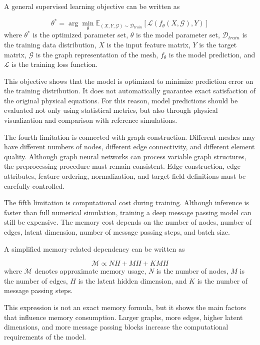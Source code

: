 A general supervised learning objective can be written as

\begin{equation}
\theta^{*}
=
\arg\min_{\theta}
\mathbb{E}_{(X,Y,\mathcal{G})\sim\mathcal{D}_{train}}
\left[
\mathcal{L}
\left(
f_{\theta}(X,\mathcal{G}),
Y
\right)
\right]
\end{equation}
where \(\theta^{*}\) is the optimized parameter set, \(\theta\) is the model parameter set, \(\mathcal{D}_{train}\) is the training data distribution, \(X\) is the input feature matrix, \(Y\) is the target matrix, \(\mathcal{G}\) is the graph representation of the mesh, \(f_{\theta}\) is the model prediction, and \(\mathcal{L}\) is the training loss function.

This objective shows that the model is optimized to minimize prediction error on the training distribution. It does not automatically guarantee exact satisfaction of the original physical equations. For this reason, model predictions should be evaluated not only using statistical metrics, but also through physical visualization and comparison with reference simulations.

The fourth limitation is connected with graph construction. Different meshes may have different numbers of nodes, different edge connectivity, and different element quality. Although graph neural networks can process variable graph structures, the preprocessing procedure must remain consistent. Edge construction, edge attributes, feature ordering, normalization, and target field definitions must be carefully controlled.

The fifth limitation is computational cost during training. Although inference is faster than full numerical simulation, training a deep message passing model can still be expensive. The memory cost depends on the number of nodes, number of edges, latent dimension, number of message passing steps, and batch size.

A simplified memory-related dependency can be written as

\begin{equation}
\mathcal{M}
\propto
N H
+
M H
+
K M H
\end{equation}
where \(\mathcal{M}\) denotes approximate memory usage, \(N\) is the number of nodes, \(M\) is the number of edges, \(H\) is the latent hidden dimension, and \(K\) is the number of message passing steps.

This expression is not an exact memory formula, but it shows the main factors that influence memory consumption. Larger graphs, more edges, higher latent dimensions, and more message passing blocks increase the computational requirements of the model.

